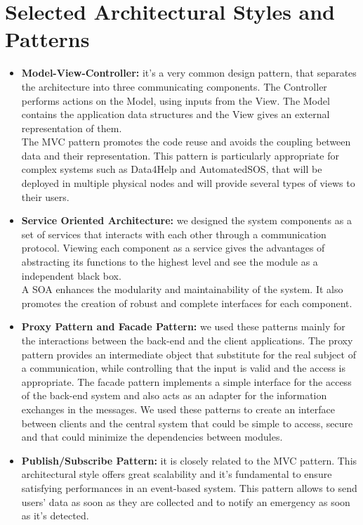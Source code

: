 \clearpage

\hypertarget{Arch_Patt}{\section{Selected Architectural Styles and Patterns}}
\begin{itemize}
    \item \textbf{Model-View-Controller:} it's a very common design pattern, that separates the architecture into three communicating components. The Controller performs actions on the Model, using inputs from the View. The Model contains the application data structures and the View gives an external representation of them.\\ 
    The MVC pattern promotes the code reuse and avoids the coupling between data and their representation. This pattern is particularly appropriate for complex systems such as Data4Help and AutomatedSOS, that will be deployed in multiple physical nodes and will provide several types of views to their users.  
    \item \textbf{\hypertarget{SOA_TG}{Service Oriented Architecture:}} we designed the system components as a set of services that interacts with each other through a communication protocol. Viewing each component as a service gives the advantages of abstracting its functions to the highest level and see the module as a independent black box.\\
    A SOA enhances the modularity and maintainability of the system. It also promotes the creation of robust and complete interfaces for each component.
    \item \textbf{Proxy Pattern and Facade Pattern:} we used these patterns mainly for the interactions between the back-end and the client applications. The proxy pattern provides an intermediate object that substitute for the real subject of a communication, while controlling that the input is valid and the access is appropriate. The facade pattern implements a simple interface for the access of the back-end system and also acts as an adapter for the information exchanges in the messages. We used these patterns to create an interface between clients and the central system that could be simple to access, secure and that could minimize the dependencies between modules.
    \item \textbf{Publish/Subscribe Pattern:} it is closely related to the MVC pattern. This architectural style offers great scalability and it's fundamental to ensure satisfying performances in an event-based system. This pattern allows to send users' data as soon as they are collected and to notify an emergency as soon as it's detected. 

\end{itemize}

